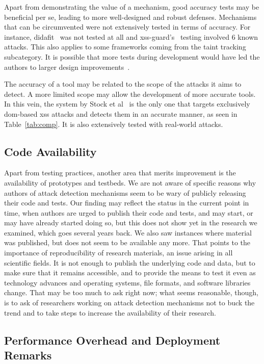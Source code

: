 \documentclass[10pt,journal,compsoc]{IEEEtran}
\begin{document}
Apart from demonstrating the value of a mechanism, good accuracy tests
may be beneficial per se, leading to more well-designed and robust
defenses. Mechanisms that can be circumvented were not extensively
tested in terms of accuracy. For instance, {\sc didafit}~\cite{LLW02}
was not tested at all and {\sc xss-guard}'s~\cite{BV08}
testing involved 6 known attacks.
This also applies to some frameworks coming from the taint tracking
subcategory. It is possible that more tests during development would
have led the authors to larger design improvements~\cite{Van14}.

The accuracy of a tool may be related to the scope of the attacks it
aims to detect. A more limited scope may allow the development of more
accurate tools. In this vein, the system by Stock et al~\cite{SLMS14}
is the only one that targets exclusively {\sc dom}-based {\sc xss}
attacks and detects them in an accurate manner, as seen in
Table~\ref{tab:comp}. It is also extensively tested with real-world
attacks.

\subsection{Code Availability}

Apart from testing practices, another area that merits improvement is
the availability of prototypes and testbeds. We are not aware of
specific reasons why authors of attack detection mechanisms seem to be
wary of publicly releasing their code and tests. Our finding may reflect
the status in the current point in time, when authors are urged to
publish their code and tests, and may start, or may have already
started doing so, but this does not show yet in the research we
examined, which goes several years back. We also saw instances where
material was published, but does not seem to be available any more.
That points to the importance of reproducibility of research materials, 
an issue arising in all scientific fields. It is not enough to
publish the underlying code and data, but to make sure that it remains
accessible, and to provide the means to test it even as technology
advances and operating systems, file formats, and software libraries
change. That may be too much to ask right now; what seems reasonable,
though, is to ask of researchers working on attack detection mechanisms not to
buck the trend and to take steps to increase the availability of their
research.

\subsection{Performance Overhead and Deployment Remarks}
\end{document}
